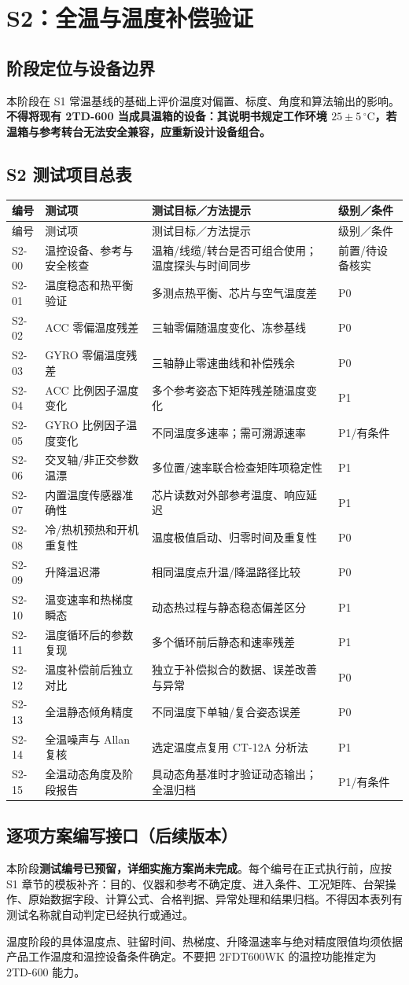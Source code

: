 \chapter{S2：全温与温度补偿验证}
\section{阶段定位与设备边界}
本阶段在 S1 常温基线的基础上评价温度对偏置、标度、角度和算法输出的影响。\textbf{不得将现有 2TD-600 当成具温箱的设备：其说明书规定工作环境 $25\pm5\,{}^\circ\mathrm C$，若温箱与参考转台无法安全兼容，应重新设计设备组合。}
\section{S2 测试项目总表}
\small
\begin{longtable}{C{18mm}p{46mm}p{61mm}p{22mm}}
\toprule 编号 & 测试项 & 测试目标／方法提示 & 级别／条件\\\midrule\endfirsthead
\toprule 编号 & 测试项 & 测试目标／方法提示 & 级别／条件\\\midrule\endhead
S2-00 & 温控设备、参考与安全核查 & 温箱/线缆/转台是否可组合使用；温度探头与时间同步 & 前置/待设备核实\\
S2-01 & 温度稳态和热平衡验证 & 多测点热平衡、芯片与空气温度差 & P0\\
S2-02 & ACC 零偏温度残差 & 三轴零偏随温度变化、冻参基线 & P0\\
S2-03 & GYRO 零偏温度残差 & 三轴静止零速曲线和补偿残余 & P0\\
S2-04 & ACC 比例因子温度变化 & 多个参考姿态下矩阵残差随温度变化 & P1\\
S2-05 & GYRO 比例因子温度变化 & 不同温度多速率；需可溯源速率 & P1/有条件\\
S2-06 & 交叉轴/非正交参数温漂 & 多位置/速率联合检查矩阵项稳定性 & P1\\
S2-07 & 内置温度传感器准确性 & 芯片读数对外部参考温度、响应延迟 & P1\\
S2-08 & 冷/热机预热和开机重复性 & 温度极值启动、归零时间及重复性 & P0\\
S2-09 & 升降温迟滞 & 相同温度点升温/降温路径比较 & P0\\
S2-10 & 温变速率和热梯度瞬态 & 动态热过程与静态稳态偏差区分 & P1\\
S2-11 & 温度循环后的参数复现 & 多个循环前后静态和速率残差 & P1\\
S2-12 & 温度补偿前后独立对比 & 独立于补偿拟合的数据、误差改善与异常 & P0\\
S2-13 & 全温静态倾角精度 & 不同温度下单轴/复合姿态误差 & P0\\
S2-14 & 全温噪声与 Allan 复核 & 选定温度点复用 CT-12A 分析法 & P1\\
S2-15 & 全温动态角度及阶段报告 & 具动态角基准时才验证动态输出；全温归档 & P1/有条件\\
\bottomrule
\end{longtable}
\normalsize
\section{逐项方案编写接口（后续版本）}
本阶段\textbf{测试编号已预留，详细实施方案尚未完成}。每个编号在正式执行前，应按 S1 章节的模板补齐：目的、仪器和参考不确定度、进入条件、工况矩阵、台架操作、原始数据字段、计算公式、合格判据、异常处理和结果归档。不得因本表列有测试名称就自动判定已经执行或通过。
\begin{warningbox}温度阶段的具体温度点、驻留时间、热梯度、升降温速率与绝对精度限值均须依据产品工作温度和温控设备条件确定。不要把 2FDT600WK 的温控功能推定为 2TD-600 能力。\end{warningbox}
